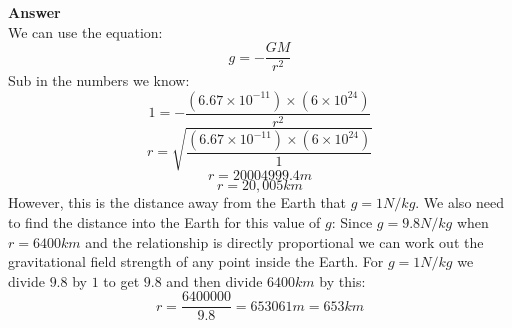 \documentclass{article}
\begin{document}
\textbf{Answer}\\
We can use the equation:
\[
	g = -\frac{GM}{r^2}
\]
Sub in the numbers we know:
\[
	1 = -\frac{(6.67 \times 10^{-11}) \times (6 \times 10^{24})}{r^2}
\]
\[
	r = \sqrt{\frac{(6.67 \times 10^{-11}) \times (6 \times 10^{24})}{1}}
\]
\[
	r = 20004999.4m
\]
\[
	r = 20,005km
\]
However, this is the distance away from the Earth that $g = 1N/kg$. We also need
to find the distance into the Earth for this value of $g$:
Since $g = 9.8N/kg$ when $r = 6400km$ and the relationship is directly
proportional we can work out the gravitational field strength of any point
inside the Earth.
For $g = 1N/kg$ we divide $9.8$ by $1$ to get $9.8$ and then divide $6400km$ by
this:
\[
	r = \frac{6400000}{9.8} = 653061m = 653km
\]
\end{document}
